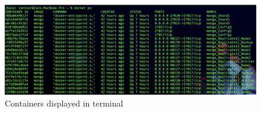 \begin{figure}[H]
\includegraphics[scale=0.45]{img/allDockerContainers.png}
\centering
\caption{Containers displayed in terminal}
\end{figure}